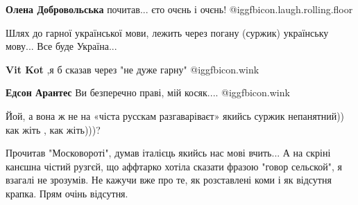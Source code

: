 \begin{itemize}
\begin{itemize}
\textbf{Олена Добровольська} почитав... єто очєнь і очєнь! @igg{fbicon.laugh.rolling.floor} 
\end{itemize}

 
Шлях до гарної української мови, лежить через погану (суржик) українську
мову... Все буде Україна...

\begin{itemize}
 
\textbf{Vit Kot} ,я б сказав через "не дуже гарну"  @igg{fbicon.wink} 

 
\textbf{Едсон Арантес} Ви безперечно праві, мій косяк....  @igg{fbicon.wink} 

\end{itemize}

 
Йой, а вона ж не на «чіста русскам разгаваріваєт» якийсь суржик непанятний)) как жіть , как жіть)))?

 

Прочитав "Московороті", думав італієць якийсь нас мові вчить... А на скріні
канєшна чістий рузгєй, що аффтарко хотіла сказати фразою "говор сельской", я
взагалі не зрозумів. Не кажучи вже про те, як розставлені коми і як відсутня
крапка. Прям очінь відсутня.



\end{itemize}
